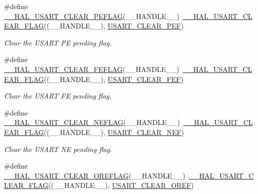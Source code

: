 \begin{DoxyCompactItemize}
\#define \hyperlink{group___u_s_a_r_t___exported___macros_ga8d03cf61b8ec17b505cb4eac48333632}{\+\_\+\+\_\+\+H\+A\+L\+\_\+\+U\+S\+A\+R\+T\+\_\+\+C\+L\+E\+A\+R\+\_\+\+P\+E\+F\+L\+AG}(\+\_\+\+\_\+\+H\+A\+N\+D\+L\+E\+\_\+\+\_\+)~\hyperlink{group___u_s_a_r_t___exported___macros_gaff3cb6ff740b240764e7844eaf3d6807}{\+\_\+\+\_\+\+H\+A\+L\+\_\+\+U\+S\+A\+R\+T\+\_\+\+C\+L\+E\+A\+R\+\_\+\+F\+L\+AG}((\+\_\+\+\_\+\+H\+A\+N\+D\+L\+E\+\_\+\+\_\+), \hyperlink{group___u_s_a_r_t___i_t___c_l_e_a_r___flags_gaf83c3d570a430dfd1a7e7a8b583736f2}{U\+S\+A\+R\+T\+\_\+\+C\+L\+E\+A\+R\+\_\+\+P\+EF})
\begin{DoxyCompactList}\small\item\em Clear the U\+S\+A\+RT PE pending flag. \end{DoxyCompactList}\item 
\#define \hyperlink{group___u_s_a_r_t___exported___macros_ga816bc7a3be6d6a96e4b69078679d9d4c}{\+\_\+\+\_\+\+H\+A\+L\+\_\+\+U\+S\+A\+R\+T\+\_\+\+C\+L\+E\+A\+R\+\_\+\+F\+E\+F\+L\+AG}(\+\_\+\+\_\+\+H\+A\+N\+D\+L\+E\+\_\+\+\_\+)~\hyperlink{group___u_s_a_r_t___exported___macros_gaff3cb6ff740b240764e7844eaf3d6807}{\+\_\+\+\_\+\+H\+A\+L\+\_\+\+U\+S\+A\+R\+T\+\_\+\+C\+L\+E\+A\+R\+\_\+\+F\+L\+AG}((\+\_\+\+\_\+\+H\+A\+N\+D\+L\+E\+\_\+\+\_\+), \hyperlink{group___u_s_a_r_t___i_t___c_l_e_a_r___flags_ga9aa038b779783f685fbc834ebf4c3077}{U\+S\+A\+R\+T\+\_\+\+C\+L\+E\+A\+R\+\_\+\+F\+EF})
\begin{DoxyCompactList}\small\item\em Clear the U\+S\+A\+RT FE pending flag. \end{DoxyCompactList}\item 
\#define \hyperlink{group___u_s_a_r_t___exported___macros_ga740fe9f08804ae46a8421a4ecc81a734}{\+\_\+\+\_\+\+H\+A\+L\+\_\+\+U\+S\+A\+R\+T\+\_\+\+C\+L\+E\+A\+R\+\_\+\+N\+E\+F\+L\+AG}(\+\_\+\+\_\+\+H\+A\+N\+D\+L\+E\+\_\+\+\_\+)~\hyperlink{group___u_s_a_r_t___exported___macros_gaff3cb6ff740b240764e7844eaf3d6807}{\+\_\+\+\_\+\+H\+A\+L\+\_\+\+U\+S\+A\+R\+T\+\_\+\+C\+L\+E\+A\+R\+\_\+\+F\+L\+AG}((\+\_\+\+\_\+\+H\+A\+N\+D\+L\+E\+\_\+\+\_\+), \hyperlink{group___u_s_a_r_t___i_t___c_l_e_a_r___flags_ga6c4b527c1b6ba5a01bbf6d6d3c6d6784}{U\+S\+A\+R\+T\+\_\+\+C\+L\+E\+A\+R\+\_\+\+N\+EF})
\begin{DoxyCompactList}\small\item\em Clear the U\+S\+A\+RT NE pending flag. \end{DoxyCompactList}\item 
\#define \hyperlink{group___u_s_a_r_t___exported___macros_gacf8140c2c877760459410dfa3cf2f4b3}{\+\_\+\+\_\+\+H\+A\+L\+\_\+\+U\+S\+A\+R\+T\+\_\+\+C\+L\+E\+A\+R\+\_\+\+O\+R\+E\+F\+L\+AG}(\+\_\+\+\_\+\+H\+A\+N\+D\+L\+E\+\_\+\+\_\+)~\hyperlink{group___u_s_a_r_t___exported___macros_gaff3cb6ff740b240764e7844eaf3d6807}{\+\_\+\+\_\+\+H\+A\+L\+\_\+\+U\+S\+A\+R\+T\+\_\+\+C\+L\+E\+A\+R\+\_\+\+F\+L\+AG}((\+\_\+\+\_\+\+H\+A\+N\+D\+L\+E\+\_\+\+\_\+), \hyperlink{group___u_s_a_r_t___i_t___c_l_e_a_r___flags_ga3f17bca944fa3409626872985e722dbd}{U\+S\+A\+R\+T\+\_\+\+C\+L\+E\+A\+R\+\_\+\+O\+R\+EF})

\end{DoxyCompactItemize}

